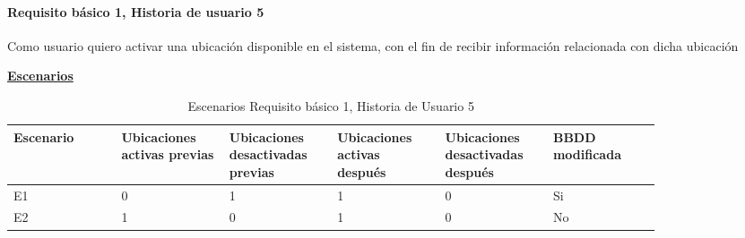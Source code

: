 \documentclass[../ei103948-project-documentation.tex]{subfiles}
\begin{document}
				\paragraph{Requisito básico 1, Historia de usuario 5}
				Como usuario quiero activar una ubicación disponible en el sistema, con el fin de recibir información relacionada con dicha ubicación

				\begin{center}
				\textbf{\underline{Escenarios}}
				\begin{table}[H]
					\centering
					\begin{tabular}{|p{0.14\linewidth}|p{0.14\linewidth}|p{0.14\linewidth}|p{0.14\linewidth}|p{0.14\linewidth}|p{0.14\linewidth}|}
						\hline
						\textbf{Escenario} & \textbf{Ubicaciones activas previas} & \textbf{Ubicaciones desactivadas previas} & \textbf{Ubicaciones activas después} & \textbf{Ubicaciones desactivadas después} & \textbf{BBDD modificada} \\ \hline
						E1                 & 0                                & 1                                     & 1                                & 0                                     & Si                       \\ \hline
						E2                 & 1                                & 0                                     & 1                                & 0                                     & No                       \\ \hline
						\end{tabular}
					\caption{Escenarios Requisito básico 1, Historia de Usuario 5}
				\end{table}

				\descripcionBasicaE



\end{center}
\end{document}
